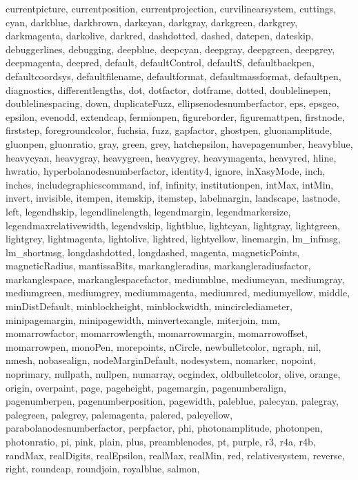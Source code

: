 {{  currentpicture, currentposition, currentprojection, curvilinearsystem,
  cuttings, cyan, darkblue, darkbrown, darkcyan, darkgray, darkgreen,
  darkgrey, darkmagenta, darkolive, darkred, dashdotted, dashed, datepen,
  dateskip, debuggerlines, debugging, deepblue, deepcyan, deepgray,
  deepgreen, deepgrey, deepmagenta, deepred, default, defaultControl,
  defaultS, defaultbackpen, defaultcoordsys, defaultfilename, defaultformat,
  defaultmassformat, defaultpen, diagnostics, differentlengths, dot,
  dotfactor, dotframe, dotted, doublelinepen, doublelinespacing, down,
  duplicateFuzz, ellipsenodesnumberfactor, eps, epsgeo, epsilon, evenodd,
  extendcap, fermionpen, figureborder, figuremattpen, firstnode, firststep,
  foregroundcolor, fuchsia, fuzz, gapfactor, ghostpen, gluonamplitude,
  gluonpen, gluonratio, gray, green, grey, hatchepsilon, havepagenumber,
  heavyblue, heavycyan, heavygray, heavygreen, heavygrey, heavymagenta,
  heavyred, hline, hwratio, hyperbolanodesnumberfactor, identity4, ignore,
  inXasyMode, inch, inches, includegraphicscommand, inf, infinity,
  institutionpen, intMax, intMin, invert, invisible, itempen, itemskip,
  itemstep, labelmargin, landscape, lastnode, left, legendhskip,
  legendlinelength, legendmargin, legendmarkersize, legendmaxrelativewidth,
  legendvskip, lightblue, lightcyan, lightgray, lightgreen, lightgrey,
  lightmagenta, lightolive, lightred, lightyellow, linemargin, lm_infmsg,
  lm_shortmsg, longdashdotted, longdashed, magenta, magneticPoints,
  magneticRadius, mantissaBits, markangleradius, markangleradiusfactor,
  markanglespace, markanglespacefactor, mediumblue, mediumcyan, mediumgray,
  mediumgreen, mediumgrey, mediummagenta, mediumred, mediumyellow, middle,
  minDistDefault, minblockheight, minblockwidth, mincirclediameter,
  minipagemargin, minipagewidth, minvertexangle, miterjoin, mm,
  momarrowfactor, momarrowlength, momarrowmargin, momarrowoffset,
  momarrowpen, monoPen, morepoints, nCircle, newbulletcolor, ngraph, nil,
  nmesh, nobasealign, nodeMarginDefault, nodesystem, nomarker, nopoint,
  noprimary, nullpath, nullpen, numarray, ocgindex, oldbulletcolor, olive,
  orange, origin, overpaint, page, pageheight, pagemargin, pagenumberalign,
  pagenumberpen, pagenumberposition, pagewidth, paleblue, palecyan, palegray,
  palegreen, palegrey, palemagenta, palered, paleyellow,
  parabolanodesnumberfactor, perpfactor, phi, photonamplitude, photonpen,
  photonratio, pi, pink, plain, plus, preamblenodes, pt, purple, r3, r4a,
  r4b, randMax, realDigits, realEpsilon, realMax, realMin, red,
  relativesystem, reverse, right, roundcap, roundjoin, royalblue, salmon,
}}
